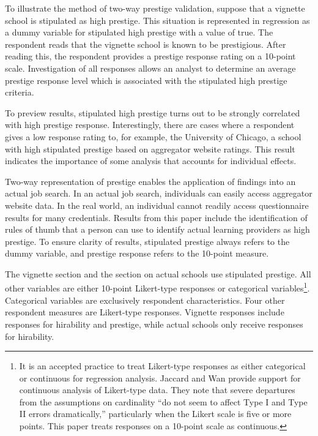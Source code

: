 To illustrate the method of two-way prestige validation,
suppose that a vignette school is stipulated as high prestige.
This situation is represented in regression as a dummy variable for stipulated high prestige with a value of true.
The respondent reads that the vignette school is known to be prestigious.
After reading this, the respondent provides a prestige response rating on a 10-point scale.
Investigation of all responses allows an analyst to determine an average prestige response level which is associated with
the stipulated high prestige criteria.

To preview results, stipulated high prestige turns out to be strongly correlated with high prestige response.
Interestingly, there are cases where a respondent gives a low response rating to, for example,
the University of Chicago, a school with high stipulated prestige based on aggregator website ratings.
This result indicates the importance of some analysis that accounts for individual effects.

Two-way representation of prestige enables the application of findings into an actual job search.
In an actual job search, individuals can easily access aggregator website data.
In the real world, an individual cannot readily access questionnaire results for many credentials.
Results from this paper include the identification of rules of thumb
that a person can use to identify actual learning providers as high prestige.
To ensure clarity of results, stipulated prestige always refers to the dummy variable, and prestige response refers to the 10-point measure.

The vignette section and the section on actual schools use stipulated prestige.
All other variables are either 10-point Likert-type responses or categorical variables\footnote{
    It is an accepted practice to treat Likert-type responses as either categorical or continuous for regression analysis.
    Jaccard and Wan provide support for continuous analysis of Likert-type data.
    They note that severe departures from the assumptions on cardinality ``do not seem to affect Type I and Type II errors dramatically,''
    particularly when the Likert scale is five or more points\cite{jaccard1996lisrel}.
    This paper treats responses on a 10-point scale as continuous.
}.
Categorical variables are exclusively respondent characteristics.
Four other respondent measures are Likert-type responses.
Vignette responses include responses for hirability and prestige,
while actual schools only receive responses for hirability.

